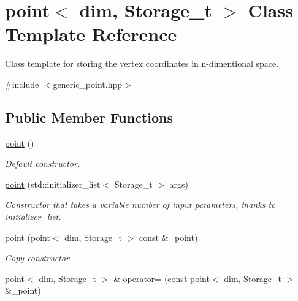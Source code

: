 \hypertarget{classpoint}{
\section{point$<$ dim, Storage\_\-t $>$ Class Template Reference}
\label{classpoint}
}


Class template for storing the vertex coordinates in n-\/dimentional space.  


{\ttfamily \#include $<$generic\_\-point.hpp$>$}\subsection*{Public Member Functions}
\begin{DoxyCompactItemize}
\item 
\hypertarget{classpoint_a6760c0eaac9d6b3d1d1591f942d389c0}{
\hyperlink{classpoint_a6760c0eaac9d6b3d1d1591f942d389c0}{point} ()}
\label{classpoint_a6760c0eaac9d6b3d1d1591f942d389c0}

\begin{DoxyCompactList}\small\item\em Default constructor. \item\end{DoxyCompactList}\item 
\hyperlink{classpoint_a0fb87b56e4911071c175143175d8750e}{point} (std::initializer\_\-list$<$ Storage\_\-t $>$ args)
\begin{DoxyCompactList}\small\item\em Constructor that takes a variable number of input parameters, thanks to initializer\_\-list. \item\end{DoxyCompactList}\item 
\hypertarget{classpoint_a89e69647cb648d886b0755114be83f57}{
\hyperlink{classpoint_a89e69647cb648d886b0755114be83f57}{point} (\hyperlink{classpoint}{point}$<$ dim, Storage\_\-t $>$ const \&\_\-point)}
\label{classpoint_a89e69647cb648d886b0755114be83f57}

\begin{DoxyCompactList}\small\item\em Copy constructor. \item\end{DoxyCompactList}\item 
\hypertarget{classpoint_aa8dbad958ee3117f85a092f7327b3020}{
\hyperlink{classpoint}{point}$<$ dim, Storage\_\-t $>$ \& \hyperlink{classpoint_aa8dbad958ee3117f85a092f7327b3020}{operator=} (const \hyperlink{classpoint}{point}$<$ dim, Storage\_\-t $>$ \&\_\-point)}
\label{classpoint_aa8dbad958ee3117f85a092f7327b3020}


\end{DoxyCompactItemize}
